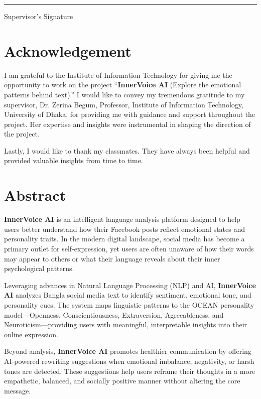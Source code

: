 \documentclass[12pt,a4paper]{report}
\begin{document}
\noindent \rule{5cm}{0.4pt}

\noindent Supervisor's Signature

\chapter*{Acknowledgement}

I am grateful to the Institute of Information Technology for giving me the opportunity to work on the project ``\textbf{InnerVoice AI} (Explore the emotional patterns behind text).'' I would like to convey my tremendous gratitude to my supervisor, Dr. Zerina Begum, Professor, Institute of Information Technology, University of Dhaka, for providing me with guidance and support throughout the project. Her expertise and insights were instrumental in shaping the direction of the project.

Lastly, I would like to thank my classmates. They have always been helpful and provided valuable insights from time to time.

\chapter*{Abstract}

\textbf{InnerVoice AI} is an intelligent language analysis platform designed to help users better understand how their Facebook posts reflect emotional states and personality traits. In the modern digital landscape, social media has become a primary outlet for self-expression, yet users are often unaware of how their words may appear to others or what their language reveals about their inner psychological patterns.

Leveraging advances in Natural Language Processing (NLP) and AI, \textbf{InnerVoice AI} analyzes Bangla social media text to identify sentiment, emotional tone, and personality cues. The system maps linguistic patterns to the OCEAN personality model—Openness, Conscientiousness, Extraversion, Agreeableness, and Neuroticism—providing users with meaningful, interpretable insights into their online expression.

Beyond analysis, \textbf{InnerVoice AI} promotes healthier communication by offering AI-powered rewriting suggestions when emotional imbalance, negativity, or harsh tones are detected. These suggestions help users reframe their thoughts in a more empathetic, balanced, and socially positive manner without altering the core message.
\end{document}
